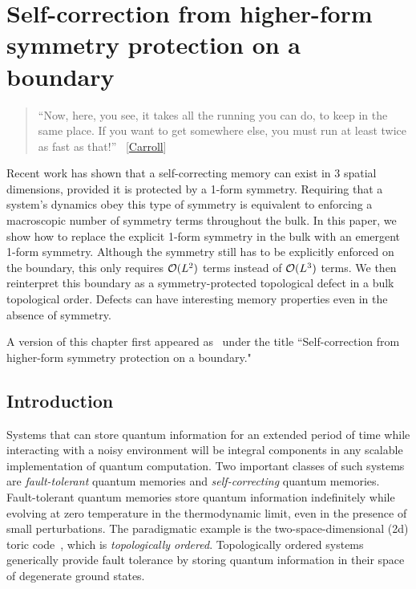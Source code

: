 
\chapter{Self-correction from higher-form symmetry protection on a boundary } \label{chp:boundary}

\begin{quotation}
	 “Now, here, you see, it takes all the running you can do, to keep in the same place. If you want to get somewhere else, you must run at least twice as fast as that!” ~[\hyperlink{cite.\therefsection @Carroll2002Alice}{Carroll}]
\end{quotation}

Recent work has shown that a self-correcting memory can exist in 3 spatial dimensions, provided it is protected by a 1-form symmetry. Requiring that a system's dynamics obey this type of symmetry is equivalent to enforcing a macroscopic number of symmetry terms throughout the bulk. In this paper, we show how to replace the explicit 1-form symmetry in the bulk with an emergent 1-form symmetry. Although the symmetry still has to be explicitly enforced on the boundary, this only requires $\cal{O}(L^2)$ terms instead of $\cal{O}(L^3)$ terms. We then reinterpret this boundary as a symmetry-protected topological defect in a bulk topological order. Defects can have interesting memory properties even in the absence of symmetry.

A version of this chapter first appeared as~\cite{Stahl2023Boundary} under the title ``Self-correction from higher-form symmetry protection on a boundary."

\section{Introduction} \label{sec:bdyintro}

Systems that can store quantum information for an extended period of time while interacting with a noisy environment will be integral components in any scalable implementation of quantum computation. Two important classes of such systems are \emph{fault-tolerant} quantum memories and \emph{self-correcting} quantum memories. Fault-tolerant quantum memories store quantum information indefinitely while evolving at zero temperature in the thermodynamic limit, even in the presence of small perturbations. The paradigmatic example is the two-space-dimensional (2d) toric code~\cite{Kitaev2003Fault}, which is \emph{topologically ordered}. Topologically ordered systems~\cite{Wen1990Topological} generically provide fault tolerance by storing quantum information in their space of degenerate ground states. 

